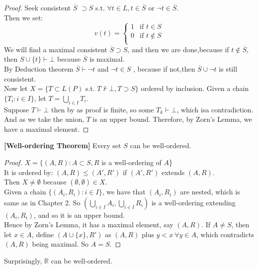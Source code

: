 \begin{proof} Seek consistent $\overline{S}$ $\supset S$ s.t. $\forall t \in L, t \in \overline{S}$ or $\neg t \in \overline{S}$.\\
Then we set:
\begin{equation*}
v(t)= \left\{
\begin{array}{ll}
1 & \text{if } t \in S\\
0 & \text{if } t \not \in S\\
\end{array} \right.
\end{equation*}
We will find a maximal consistent $\overline{S} \supset S$,
and then we are done,because if $t \not \in \overline{S}$,
then $S \cup \{t\} \vdash \bot$ because $\overline{S}$ is maximal.\\
By Deduction theorem $\overline{S} \vdash \neg t$ and $\neg t \in S$ ,
because if not,then $\overline{S} \cup \neg t$ is still consistent.\\
Now let $X = \{T \subset L(P)$ s.t. $T \not \vdash \bot, T \supset S\}$
ordered by inclusion.
Given a chain $\{T_i: i \in I\}$, let $T=\bigcup_{i \in I}T_i$.\\
Suppose $T \vdash \bot$ then by as proof is finite, so some $T_k \vdash \bot$,
which isa contradiction. And as we take the union, $T$ is an upper bound.
Therefore, by Zorn's Lemma, we have a maximal element.
\end{proof}
\begin{theorem}{\bf [Well-ordering Theorem]}\label{W;Well-ordering}
Every set $S$ can be well-ordered.
\end{theorem}
\begin{proof} $X = \{(A,R): A \subset S, R$ is a well-ordering of $A$\}\\
It is ordered by: $(A,R) \le (A',R')$ if $(A',R')$ extends $(A,R)$.\\
Then $X \neq \emptyset$ because $(\emptyset,\emptyset) \in X$.\\
Given a chain $\{(A_i,R_i): i \in I\}$, we have that $(A_i,R_i)$
are nested, which is same as in Chapter 2. So $(\bigcup_{i \in I}A_i,\bigcup_{i \in I}R_i)$
is a well-ordering extending $(A_i,R_i)$, and so it is an upper bound.\\
Hence by Zorn's Lemma, it has a maximal element, say $(A,R)$.
If $A \neq S$, then let $x \in A$, define $(A \cup \{x\},R')$ as
$(A,R)$ plus $y < x~\forall y \in A$, which contradicts $(A,R)$ being maximal.
So $A=S$.
\end{proof}
\begin{remark} Surprisingly, $\mathbb{R}$ can be well-ordered.
\end{remark}
